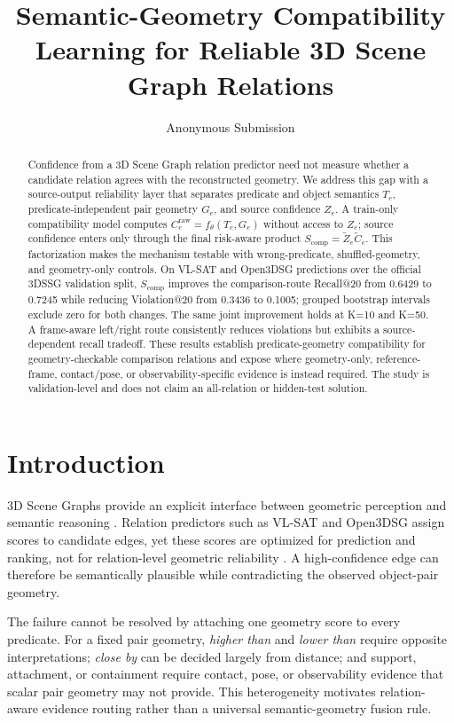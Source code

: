\documentclass[letterpaper]{article} %
\title{Semantic-Geometry Compatibility Learning for Reliable 3D Scene Graph Relations}
\author{Anonymous Submission}
\newcommand{\Te}{\ensuremath{T_e}}
\newcommand{\Ge}{\ensuremath{G_e}}
\newcommand{\Ze}{\ensuremath{Z_e}}
\newcommand{\Scomp}{\ensuremath{S_{\mathrm{comp}}}}
\begin{document}
\maketitle

\begin{abstract}
Confidence from a 3D Scene Graph relation predictor need not measure whether a
candidate relation agrees with the reconstructed geometry. We address this gap
with a source-output reliability layer that separates predicate and object
semantics $\Te$, predicate-independent pair geometry $\Ge$, and source
confidence $\Ze$. A train-only compatibility model computes
$C_e^{\mathrm{raw}}=f_\theta(\Te,\Ge)$ without access to $\Ze$; source
confidence enters only through the final risk-aware product
$\Scomp=\widetilde Z_e\widetilde C_e$. This factorization makes the mechanism
testable with wrong-predicate, shuffled-geometry, and geometry-only controls.
On VL-SAT and Open3DSG predictions over the official 3DSSG validation split,
$\Scomp$ improves the comparison-route Recall@20 from 0.6429 to 0.7245 while
reducing Violation@20 from 0.3436 to 0.1005; grouped bootstrap intervals exclude
zero for both changes. The same joint improvement holds at K=10 and K=50. A
frame-aware left/right route consistently reduces violations but exhibits a
source-dependent recall tradeoff. These results establish predicate-geometry
compatibility for geometry-checkable comparison relations and expose where
geometry-only, reference-frame, contact/pose, or observability-specific evidence
is instead required. The study is validation-level and does not claim an
all-relation or hidden-test solution.
\end{abstract}

\section{Introduction}

3D Scene Graphs provide an explicit interface between geometric perception and
semantic reasoning \cite{armeni2019scenegraph,wald2020learning,
wu2021scenegraphfusion}. Relation predictors such as VL-SAT and Open3DSG assign
scores to candidate edges, yet these scores are optimized for prediction and
ranking, not for relation-level geometric reliability
\cite{wang2023vlsat,koch2024open3dsg}. A high-confidence edge can therefore be
semantically plausible while contradicting the observed object-pair geometry.

The failure cannot be resolved by attaching one geometry score to every
predicate. For a fixed pair geometry, \emph{higher than} and \emph{lower than}
require opposite interpretations; \emph{close by} can be decided largely from
distance; and support, attachment, or containment require contact, pose, or
observability evidence that scalar pair geometry may not provide. This
heterogeneity motivates relation-aware evidence routing rather than a universal
semantic-geometry fusion rule.
\end{document}
